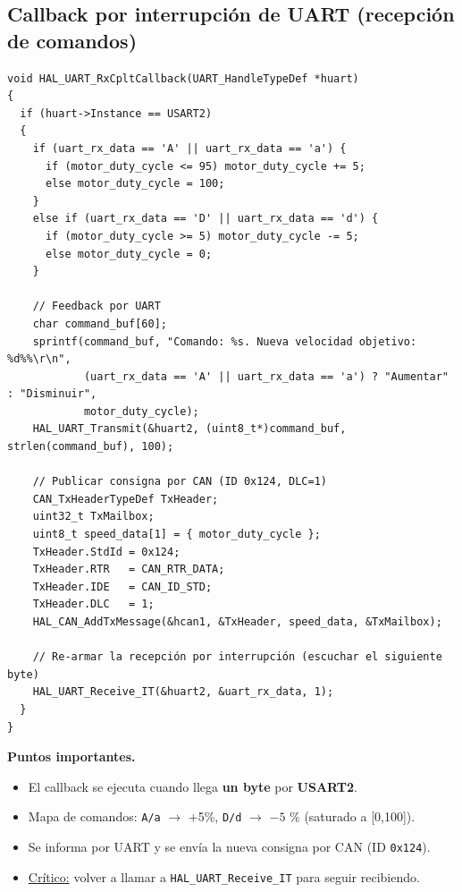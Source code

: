 \documentclass[a4paper,12pt]{article}
\begin{document}
\subsection{Callback por interrupción de UART (recepción de comandos)}
\begin{lstlisting}
void HAL_UART_RxCpltCallback(UART_HandleTypeDef *huart)
{
  if (huart->Instance == USART2)
  {
    if (uart_rx_data == 'A' || uart_rx_data == 'a') {
      if (motor_duty_cycle <= 95) motor_duty_cycle += 5;
      else motor_duty_cycle = 100;
    }
    else if (uart_rx_data == 'D' || uart_rx_data == 'd') {
      if (motor_duty_cycle >= 5) motor_duty_cycle -= 5;
      else motor_duty_cycle = 0;
    }

    // Feedback por UART
    char command_buf[60];
    sprintf(command_buf, "Comando: %s. Nueva velocidad objetivo: %d%%\r\n",
            (uart_rx_data == 'A' || uart_rx_data == 'a') ? "Aumentar" : "Disminuir",
            motor_duty_cycle);
    HAL_UART_Transmit(&huart2, (uint8_t*)command_buf, strlen(command_buf), 100);

    // Publicar consigna por CAN (ID 0x124, DLC=1)
    CAN_TxHeaderTypeDef TxHeader;
    uint32_t TxMailbox;
    uint8_t speed_data[1] = { motor_duty_cycle };
    TxHeader.StdId = 0x124;
    TxHeader.RTR   = CAN_RTR_DATA;
    TxHeader.IDE   = CAN_ID_STD;
    TxHeader.DLC   = 1;
    HAL_CAN_AddTxMessage(&hcan1, &TxHeader, speed_data, &TxMailbox);

    // Re-armar la recepción por interrupción (escuchar el siguiente byte)
    HAL_UART_Receive_IT(&huart2, &uart_rx_data, 1);
  }
}
\end{lstlisting}

\noindent\textbf{Puntos importantes.}
\begin{itemize}
  \item El callback se ejecuta cuando llega \textbf{un byte} por \textbf{USART2}.
  \item Mapa de comandos: \texttt{A/a} $\rightarrow$ +5\%, \texttt{D/d} $\rightarrow$  $-5$ \% (saturado a [0,100]).
  \item Se informa por UART y se envía la nueva consigna por CAN (ID \texttt{0x124}).
  \item \underline{Crítico:} volver a llamar a \texttt{HAL\_UART\_Receive\_IT} para seguir recibiendo.
\end{itemize}
\end{document}
